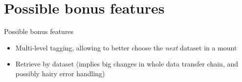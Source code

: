 \documentclass[aspectratio=149]{beamer}
\begin{document}
\section{Possible bonus features}
\begin{frame}{Possible bonus features}
\begin{itemize}
  \item Multi-level tagging, allowing to better choose the {\em{}next} dataset in a mount
  \item Retrieve by dataset (implies big changes in whole data transfer chain, and possibly hairy error handling)
\end{itemize}
\end{frame}
%	
%	

\backcover
\end{document}
